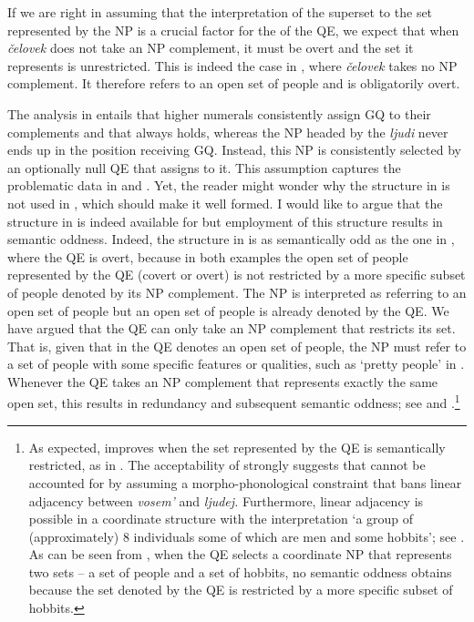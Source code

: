 \documentclass[output=paper,modfonts,newtxmath,hidelinks]{langscibook}
\begin{document}
\largerpage
If we are right in assuming that the interpretation of the superset to the set represented by the NP is a crucial factor for the  of the QE, we expect that when \textit{čelovek} does not take an NP complement, it must be overt and the set it represents is unrestricted. This is indeed the case in , where \textit{čelovek} takes no NP complement. It therefore refers to an open set of people and is obligatorily overt.

The analysis in  entails that  higher numerals consistently assign GQ to their complements and that  always holds, whereas the NP headed by the  \textit{ljudi} never ends up in the position receiving GQ. Instead, this NP is consistently selected by an optionally null QE that assigns   to it. This assumption captures the problematic data in  and . Yet, the reader might wonder why the structure in  is not used in , which should make it well formed. I would like to argue that the structure in  is indeed available for  but employment of this structure results in semantic oddness. Indeed, the structure in  is as semantically odd as the one in , where the QE is overt, because in both examples the open set of people represented by the QE (covert or overt) is not restricted by a more specific subset of people denoted by its NP complement. The NP is interpreted as referring to an open set of people but an open set of people is already denoted by the QE. We have argued that the QE can only take an NP complement that restricts its set. That is, given that in  the QE denotes an open set of people, the NP must refer to a set of people with some specific features or qualities, such as ‘pretty people’ in . Whenever the QE takes an NP complement that represents exactly the same open set, this results in redundancy and subsequent semantic oddness; see  and .\footnote{\label{18:fn13}As expected,  improves when the set represented by the QE is semantically restricted, as in . The acceptability of  strongly suggests that  cannot be accounted for by assuming a morpho-phonological constraint that bans linear adjacency between \textit{vosem’} and \textit{ljudej.} Furthermore, linear adjacency is possible in a coordinate structure with the interpretation ‘a group of (approximately) 8 individuals some of which are men and some hobbits’; see . As can be seen from , when the QE selects a coordinate NP that represents two sets -- a set of people and a set of hobbits, no semantic oddness obtains because the set denoted by the QE is restricted by a more specific subset of hobbits.
\z

}
\end{document}
